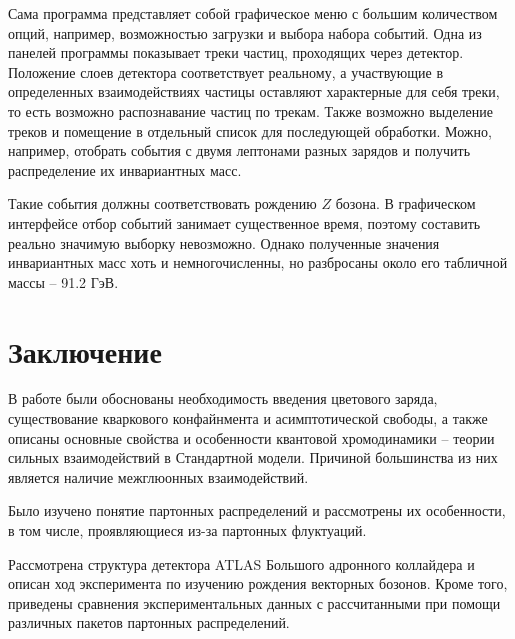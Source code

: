 \documentclass[12pt, a4paper]{article}
\begin{document}

Сама программа представляет собой графическое меню с большим количеством опций, например, возможностью загрузки и выбора набора событий. Одна из панелей программы показывает треки частиц, проходящих через детектор. Положение слоев детектора соответствует реальному, а участвующие в определенных взаимодействиях частицы оставляют характерные для себя треки, то есть возможно распознавание частиц по трекам. Также возможно выделение треков и помещение в отдельный список для последующей обработки. Можно, например, отобрать события с двумя лептонами разных зарядов и получить распределение их инвариантных масс.

Такие события должны соответствовать рождению $Z$ бозона. В графическом интерфейсе отбор событий занимает существенное время, поэтому составить реально значимую выборку невозможно. Однако полученные значения инвариантных масс хоть и немногочисленны, но разбросаны около его табличной массы -- 91.2 ГэВ.

\section{Заключение}
В работе были обоснованы необходимость введения цветового заряда, существование кваркового конфайнмента и асимптотической свободы, а также описаны основные свойства и особенности квантовой хромодинамики -- теории сильных взаимодействий в Стандартной модели. Причиной большинства из них является наличие межглюонных взаимодействий.

Было изучено понятие партонных распределений и рассмотрены их особенности, в том числе, проявляющиеся из-за партонных флуктуаций.

Рассмотрена структура детектора ATLAS Большого адронного коллайдера и описан ход эксперимента по изучению рождения векторных бозонов. Кроме того, приведены сравнения экспериментальных данных с рассчитанными при помощи различных пакетов партонных распределений.
\end{document}
